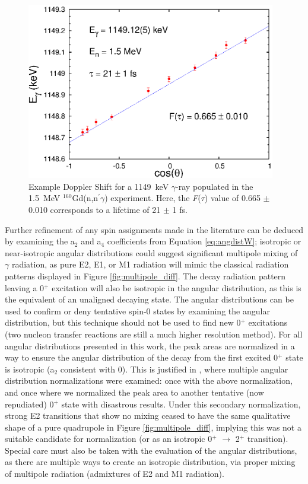 \begin{figure}[ht]
\begin{center}
\includegraphics[width=0.97\textwidth]{figures/DSAM_example.eps}
\caption{Example Doppler Shift for a 1149~keV $\gamma$-ray populated in the 1.5~MeV $^{160}$Gd(n,n$^\prime\gamma$) experiment. Here, the \textit{F}(\textit{$\tau$}) value of 0.665 $\pm$ 0.010 corresponds to a lifetime of 21 $\pm$ 1 fs.
\label{fig:DSAM_example}}
\end{center}
\end{figure}

Further refinement of any spin assignments made in the literature can be deduced by examining the a$_2$ and a$_4$ coefficients from Equation \ref{eq:angdistW}; isotropic or near-isotropic angular distributions could suggest significant multipole mixing of $\gamma$ radiation, as pure E2, E1, or M1 radiation will mimic the classical radiation patterns displayed in Figure \ref{fig:multipole_diff}. The decay radiation pattern leaving a 0$^+$ excitation will also be isotropic in the angular distribution, as this is the equivalent of an unaligned decaying state. The angular distributions can be used to confirm or deny tentative spin-0 states by examining the angular distribution, but this technique should not be used to find new 0$^+$ excitations (two nucleon transfer reactions are still a much higher resolution method). For all angular distributions presented in this work, the peak areas are normalized in a way to ensure the angular distribution of the decay from the first excited 0$^+$ state is isotropic (a$_2$ consistent with 0). This is justified in \cite{Lesher_160Gd0s}, where multiple angular distribution normalizations were examined: once with the above normalization, and once where we normalized the peak area to another tentative (now repudiated) 0$^+$ state with disastrous results. Under this secondary normalization, strong E2 transitions that show no mixing ceased to have the same qualitative shape of a pure quadrupole in Figure \ref{fig:multipole_diff}, implying this was not a suitable candidate for normalization (or as an isotropic 0$^+$ $\rightarrow$ 2$^+$ transition). Special care must also be taken with the evaluation of the angular distributions, as there are multiple ways to create an isotropic distribution, via proper mixing of multipole radiation (admixtures of E2 and M1 radiation).

